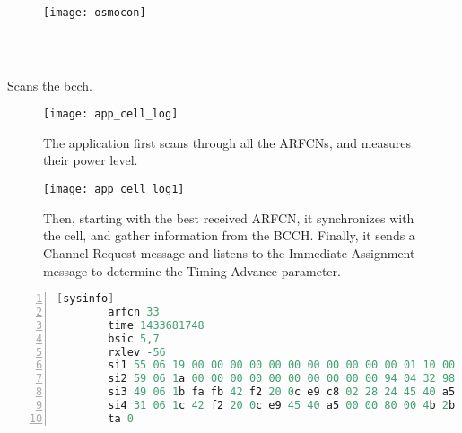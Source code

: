       \begin{figure}
        \centering
        \texttt{[image: osmocon]}
        \caption{~\cite{osmocombb_osmocon}}
        \label{fig:osmocon}
      \end{figure}

    \subsection{}

    \iffalse
       The cell_log application scans through valid available carrier
       frequencies, attempts to sync to them and dumps information
       gathered from the BCCH.

       It is usually used to create a list of used ARFCNs and
       information such as their reception levels, MNC, MCC, and System
       Information. 
       \fi

       Scans the bcch.

      \begin{figure}[h]
        \centering
        \texttt{[image: app\_cell\_log]}
        \caption{The  application first scans through
        all the ARFCNs, and measures their power level.}
        \label{fig:app_cell_log}
      \end{figure}

      \begin{figure}[h]
        \centering
        \texttt{[image: app\_cell\_log1]}
        \caption{Then, starting with the best received ARFCN, it
          synchronizes with the cell, and gather information from the
          BCCH. Finally, it sends a Channel Request message and listens
          to the Immediate Assignment message to determine the Timing
          Advance parameter.}
        \label{fig:app_cell_log1}
      \end{figure}

      \begin{lstlisting}[language=C, numbers=left,
      basicstyle=\footnotesize, breaklines=true, frame=single]
        [sysinfo]
        arfcn 33
        time 1433681748
        bsic 5,7
        rxlev -56
        si1 55 06 19 00 00 00 00 00 00 00 00 00 00 00 01 10 00 00 00 a5 00 00 2b
        si2 59 06 1a 00 00 00 00 00 00 00 00 00 00 94 04 32 98 18 d0 df a5 00 00
        si3 49 06 1b fa fb 42 f2 20 0c e9 c8 02 28 24 45 40 a5 00 00 80 00 01 1b
        si4 31 06 1c 42 f2 20 0c e9 45 40 a5 00 00 80 00 4b 2b 2b 2b 2b 2b 2b 2b
        ta 0
        \end{lstlisting}
    
